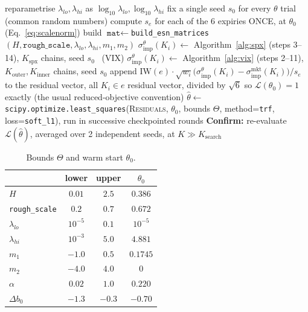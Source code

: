 \documentclass[11pt]{article}
\begin{document}
\begin{algorithm}[h]
\caption{Joint calibration}
\label{alg:jointcalib}
\begin{algorithmic}[1]
\State reparametrise $\lambda_{lo},\lambda_{hi}$ as $\log_{10}\lambda_{lo},\log_{10}\lambda_{hi}$ 
\State fix a single seed $s_0$ for every $\theta$ trial (common random numbers)
\State compute $s_e$ for each of the 6 expiries ONCE, at $\theta_0$ (Eq.~\eqref{eq:scalenorm}) 
    \State build $\texttt{mat}\gets$\texttt{build\_esn\_matrices}$(H,\texttt{rough\_scale},\lambda_{lo},\lambda_{hi},m_1,m_2)$
         $\sigma_{\text{imp}}^\theta(K_i)\gets$ Algorithm~\ref{alg:spx} (steps 3--14), $K_{\text{spx}}$ chains, seed $s_0$
        \Else\ (VIX) $\sigma_{\text{imp}}^\theta(K_i)\gets$ Algorithm~\ref{alg:vix} (steps 2--11), $K_{\text{outer}},K_{\text{inner}}$ chains, seed $s_0$
        \EndIf
        \State append $\text{IW}(e)\cdot\sqrt{w_i}\big(\sigma_{\text{imp}}^\theta(K_i)-\sigma_{\text{imp}}^{\text{mkt}}(K_i)\big)/s_e$ to the residual vector, all $K_i\in e$ 
    \EndFor
    \State \Return residual vector, divided by $\sqrt{6}$ so $\mathcal L(\theta_0)=1$ exactly (the usual reduced-objective convention)
\EndFunction
\State $\hat\theta\gets$ \texttt{scipy.optimize.least\_squares}(\textsc{Residuals}, $\theta_0$, bounds $\Theta$, method=\texttt{trf}, loss=\texttt{soft\_l1}), run in successive checkpointed rounds
\State \textbf{Confirm:} re-evaluate $\mathcal L(\hat\theta)$, averaged over 2 independent seeds, at $K\gg K_{\text{search}}$
\end{algorithmic}
\end{algorithm}

\begin{table}[h]
\centering
\caption{Bounds $\Theta$ and warm start $\theta_0$.}
\label{tab:calibbounds}
\begin{tabular}{lccc}
\toprule
& lower & upper & $\theta_0$ \\
\midrule
$H$ & $0.01$ & $2.5$ & $0.386$ \\
\texttt{rough\_scale} & $0.2$ & $0.7$ & $0.672$ \\
$\lambda_{lo}$ & $10^{-5}$ & $0.1$ & $10^{-5}$ \\
$\lambda_{hi}$ & $10^{-3}$ & $5.0$ & $4.881$ \\
$m_1$ & $-1.0$ & $0.5$ & $0.1745$ \\
$m_2$ & $-4.0$ & $4.0$ & $0$ \\
$\alpha$ & $0.02$ & $1.0$ & $0.220$ \\
$\Delta b_0$ & $-1.3$ & $-0.3$ & $-0.70$ \\
\bottomrule
\end{tabular}
\end{table}
\end{document}
